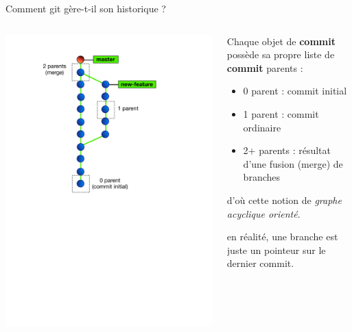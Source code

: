 \begin{frame}{%
\protect\hypertarget{comment-git-guxe8re-t-il-son-historique}{%
Comment git gère-t-il son historique ?}}

\begin{columns}[T]
\begin{column}{0.40\textwidth}
\includegraphics[width=1\textwidth]{images/dag.pdf}
\end{column}

\begin{column}{0.60\textwidth}
Chaque objet de \textbf{commit} possède sa propre liste de
\textbf{commit} parents :

\begin{itemize}
\tightlist
\item
  0 parent : commit initial
\item
  1 parent : commit ordinaire
\item
  2+ parents : résultat d’une fusion (merge) de branches
\end{itemize}

d’où cette notion de \emph{graphe acyclique orienté}.

en réalité, une branche est juste un pointeur sur le dernier commit.
\end{column}
\end{columns}

\end{frame}

